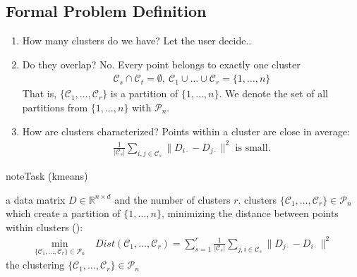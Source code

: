 \documentclass[letterpaper,10pt,english]{jupyterBook}
\begin{document}
\subsection{Formal Problem Definition}
\label{\detokenize{clustering_k_means:formal-problem-definition}}\begin{enumerate}
%
\item {} 
\sphinxAtStartPar
How many clusters do we have? Let the user decide..

\item {} 
\sphinxAtStartPar
Do they overlap? No. Every point belongs to exactly one cluster
\begin{equation*}
\begin{split}\mathcal{C}_s\cap\mathcal{C}_t=\emptyset,\  \mathcal{C}_1\cup\ldots\cup\mathcal{C}_r=\{1,\ldots, n\}\end{split}
\end{equation*}
That is,  \(\{\mathcal{C}_1,\ldots,\mathcal{C}_r\}\) is a partition of \(\{1,\ldots,n\}\).
We denote the set of all partitions from \(\{1,\ldots,n\}\) with \(\mathcal{P}_n\).

\item {} 
\sphinxAtStartPar
How are clusters characterized? Points within a cluster are close in average:
\begin{equation*}
\begin{split} \frac{1}{|\mathcal{C}_s|}\sum_{i,j\in\mathcal{C}_s}\|D_{i\cdot}-D_{j\cdot}\|^2 \text{ is small.}\end{split}
\end{equation*}

\end{enumerate}

\begin{sphinxadmonition}{note}{Task (k\sphinxhyphen{}means)}

\sphinxAtStartPar
{} a data matrix \(D\in\mathbb{R}^{n\times d}\) and the number of clusters \(r\). clusters \(\{\mathcal{C}_1,\ldots,\mathcal{C}_r\}\in\mathcal{P}_n\) which create a partition of \(\{1,\ldots,n\}\), minimizing the distance between points within clusters ():
\label{equation:clustering_k_means:8459096d-e100-469a-8b72-c774e455958b}\begin{align}
\min_{\{\mathcal{C}_1,\ldots,\mathcal{C}_r\}\in\mathcal{P}_n} &\ Dist(\mathcal{C}_1,\ldots,\mathcal{C}_r) = \sum_{s=1}^r\frac{1}{|\mathcal{C}_s|}\sum_{j,i\in\mathcal{C}_s}\|D_{j\cdot}-D_{i\cdot}\|^2 \label{eq:k-means}
\end{align}
\sphinxAtStartPar
{} the clustering \(\{\mathcal{C}_1,\ldots,\mathcal{C}_r\}\in\mathcal{P}_n\)
\end{sphinxadmonition}
\end{document}
